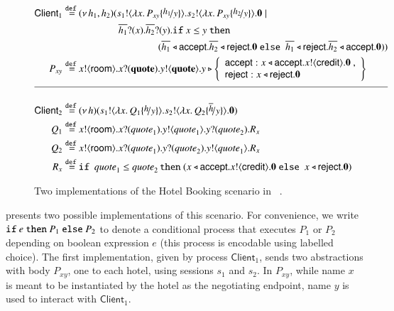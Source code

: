 \documentclass[preprint,11pt]{elsarticle}
\newcommand{\rtype}{\mathsf{room}}
\newcommand{\Quotev}{\mathit{quote}}
\newcommand{\accept}{\mathsf{accept}}
\newcommand{\reject}{\mathsf{reject}}
\newcommand{\creditc}{\mathsf{credit}}
\newcommand{\Client}{\mathsf{Client}}
\begin{document}
{%
\begin{figure}[t!]
	\begin{align*}%
		 \Client_1    \defeq  &  \newsp{h_1, h_2}{\bout{s_1}{\abs{x}{P_{xy} \subst{h_1}{y}}} \bout{s_2}{\abs{x}{P_{xy} \subst{h_2}{y}}} \inact \Par  \\
		 & 
		\qquad \qquad\binp{\dual{h_1}}{x} \binp{\dual{h_2}}{y}  \If x \leq y\   \Then
		\\
		 & \qquad\qquad \qquad \qquad (\bsel{\dual{h_1}}{\accept} \bsel{\dual{h_2}}{\reject} \inact \ \Else \ \bsel{\dual{h_1}}{\reject} \bsel{\dual{h_2}}{\accept} \inact )
		}
		\\
				 P_{xy}     \defeq &    \bout{x}{\rtype} \binp{x}{\Quotev} \bout{y}{\Quotev}
		y \triangleright \left\{
				\begin{array}{l}
					\accept: \bsel{x}{\accept} \bout{x}{\creditc} \inact~,\\
					\reject: \bsel{x}{\reject} \inact
				\end{array}
				\right\}
				\\[2mm]
				\hline
				\\
						\Client_2 \defeq& \newsp{h}{\bout{s_1}{\abs{x}{Q_1 \subst{h}{y}}} \bout{s_2}{\abs{x}{Q_2 \subst{\dual{h}}{y}}} \inact}
\\
		Q_1 \defeq&	\bout{x}{\rtype} \binp{x}{\Quotev_1} \bout{y}{\Quotev_1} \binp{y}{\Quotev_2} R_x \\
		Q_2 \defeq&	\bout{x}{\rtype} \binp{x}{\Quotev_1} \binp{y}{\Quotev_2} \bout{y}{\Quotev_1} R_x \\
			    R_x  \defeq & \If\ \Quotev_1 \leq \Quotev_2 \, \Then  (\bsel{x}{\accept} \bout{x}{\creditc} \inact \  \Else \ \bsel{x}{\reject} \inact)
	\end{align*}
	\caption{Two implementations of the Hotel Booking scenario in \HOp~\cite{KouzapasPY17}.}\label{f:hotel}
	\end{figure}
%
 presents
two possible \HOp implementations of this scenario.
For convenience, we write 
$\mathtt{if}\  e\ \mathtt{then}\  P_1\ \mathtt{else}\   P_2$
to denote a conditional process that executes $P_1$ or $P_2$ depending on boolean expression $e$ (this process is encodable using labelled choice).
The {first implementation}, given by 
process $\Client_1$, sends two abstractions with body $P_{xy}$, one to each hotel, 
		using sessions $s_1$ and $s_2$.
		In $P_{xy}$, %
	while
		name $x$ is meant to be instantiated by the hotel as the negotiating
		endpoint, name $y$ is used to interact with $\Client_1$.	
}
\end{document}
